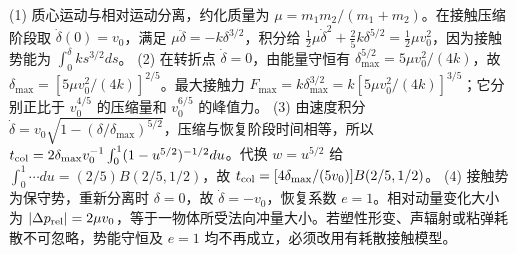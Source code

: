 (1) 质心运动与相对运动分离，约化质量为 \(\mu=m_1m_2/(m_1+m_2)\)。在接触压缩阶段取 \(\dot\delta(0)=v_0\)，满足 \(\mu\ddot\delta=-k\delta^{3/2}\)，积分给 \(\frac12\mu\dot\delta^2+\frac25k\delta^{5/2}=\frac12\mu v_0^2\)，因为接触势能为 \(\int_0^\delta k s^{3/2}ds\)。
(2) 在转折点 \(\dot\delta=0\)，由能量守恒有 \(\delta_{\max}^{5/2}=5\mu v_0^2/(4k)\)，故 \(\delta_{\max}=[5\mu v_0^2/(4k)]^{2/5}\)。最大接触力 \(F_{\max}=k\delta_{\max}^{3/2}=k[5\mu v_0^2/(4k)]^{3/5}\)；它分别正比于 \(v_0^{4/5}\) 的压缩量和 \(v_0^{6/5}\) 的峰值力。
(3) 由速度积分 \(\dot\delta=v_0\sqrt{1-(\delta/\delta_{\max})^{5/2}}\)，压缩与恢复阶段时间相等，所以 \(t_{\rm col}=2\delta_{\max}v_0^{-1}\int_0^1(1-u^{5/2})^{-1/2}du\)。代换 \(w=u^{5/2}\) 给 \(\int_0^1\cdots du=(2/5)B(2/5,1/2)\)，故 \(t_{\rm col}=[4\delta_{\max}/(5v_0)]B(2/5,1/2)\)。
(4) 接触势为保守势，重新分离时 \(\delta=0\)，故 \(\dot\delta=-v_0\)，恢复系数 \(e=1\)。相对动量变化大小为 \(|\Delta p_{\rm rel}|=2\mu v_0\)，等于一物体所受法向冲量大小。若塑性形变、声辐射或粘弹耗散不可忽略，势能守恒及 \(e=1\) 均不再成立，必须改用有耗散接触模型。

